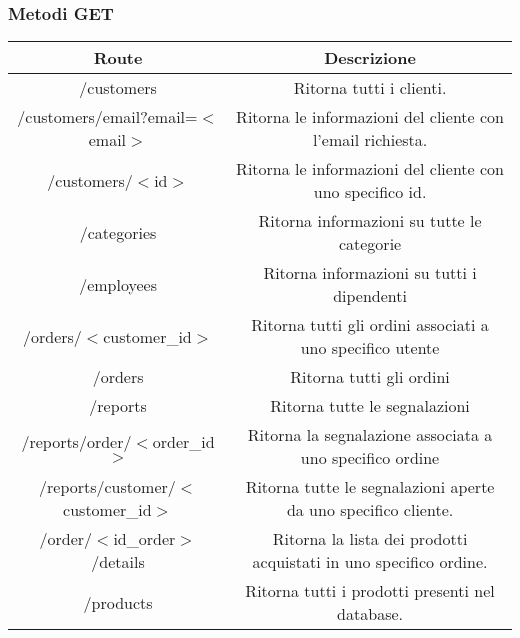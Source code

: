 \subsubsection{Metodi GET}
\begin{center}
\begin{tabular}{ |c|c|} 
\hline
Route & Descrizione \\
\hline
\multirow{2}{20em}{/customers} & \multirow{2}{15em}{Ritorna tutti i clienti.}\\
 & \\
 \hline
\multirow{3}{20em}{/customers/email?email=$<$email$>$} & \multirow{3}{15em}{Ritorna le informazioni del cliente con l'email richiesta.}\\
 & \\
 & \\
 \hline
 \multirow{2}{20em}{/customers/$<$id$>$} & \multirow{2}{15em}{Ritorna le informazioni del cliente con uno specifico id.}\\
 & \\
 \hline
\multirow{2}{20em}{/categories} & \multirow{2}{15em}{Ritorna informazioni su tutte le categorie}\\
& \\
\hline\multirow{2}{20em}{/employees} & \multirow{2}{15em}{Ritorna informazioni su tutti i dipendenti}\\
& \\
\hline\multirow{2}{20em}{/orders/$<$customer\_id$>$ } & \multirow{2}{15em}{Ritorna tutti gli ordini associati a uno specifico utente}\\
& \\
\hline\multirow{2}{20em}{/orders} & \multirow{2}{15em}{Ritorna tutti gli ordini}\\
& \\
\hline\multirow{2}{20em}{/reports} & \multirow{2}{15em}{Ritorna tutte le segnalazioni}\\
& \\
\hline\multirow{2}{20em}{/reports/order/$<$order\_id$>$} & \multirow{2}{15em}{Ritorna la segnalazione associata a uno specifico ordine}\\
& \\
\hline\multirow{2}{20em}{/reports/customer/$<$customer\_id$>$} & \multirow{2}{15em}{Ritorna tutte le segnalazioni aperte da uno specifico cliente.}\\
& \\
\hline\multirow{2}{20em}{/order/$<$id\_order$>$/details} & \multirow{2}{15em}{Ritorna la lista dei prodotti acquistati in uno specifico ordine.}\\
& \\
\hline\multirow{2}{20em}{/products} & \multirow{2}{15em}{Ritorna tutti i prodotti presenti nel database. }\\
& \\
\hline
\end{tabular}
\end{center}

